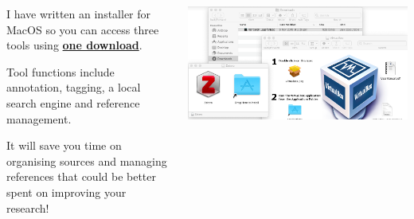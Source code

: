 \documentclass[unknownkeysallowed,usepdftitle=false, parskip=full, aspectratio=169]{beamer}
\newcommand{\secvariable}{nothing}
\begin{document}
\begin{frame}
{\begin{columns}[t]
\begin{column}[c]{0.5\textwidth}
 \vspace{12pt}


 
   \end{column}
  \end{columns}

}

   
\end{frame}

\begin{frame}\label{\secvariable}
    \parbox{\linewidth}{

\begin{columns}[t]
\begin{column}[c]{0.5\textwidth}
      
      I have written an installer for MacOS so you can access three tools using \href{https://github.com/MQ-FOAR705/Osmond-Chiu---Proof-of-Concept---Implementation.git}{\textbf{one download}}.
 
      \vspace{12pt}
      
      Tool functions include annotation, tagging, a local search engine and reference management.
      
      \vspace{12pt}
 
      It will save you time on organising sources and managing references that could be better spent on improving your research!

 \end{column}
    \begin{column}[c]{0.5\textwidth}
\includegraphics[width=1\textwidth,height=0.5\textheight,keepaspectratio]{figure/macos.png}\\
   \end{column}
  \end{columns}
}
 
\end{frame}
\end{document}
